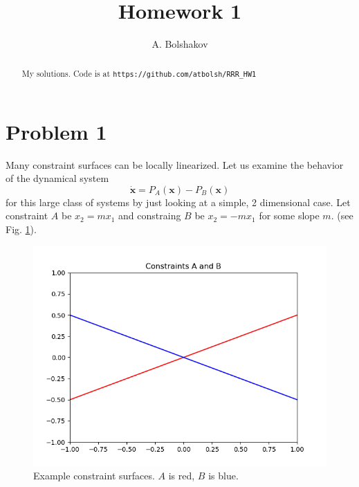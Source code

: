 \documentclass[psamsfonts]{amsart}
\title{Homework 1}
\author{A. Bolshakov}
\theoremstyle{definition}
\theoremstyle{remark}
\numberwithin{equation}{section}
\begin{document}
\maketitle


\begin{abstract}
My solutions. Code is at \texttt{https://github.com/atbolsh/RRR\_HW1}
\end{abstract}

\section{Problem 1}

Many constraint surfaces can be locally linearized. 
Let us examine the behavior of the dynamical system
\[
\dot{\mathbf{x}} = P_A(\mathbf{x}) - P_B(\mathbf{x})
\]
for this large class of systems by just looking at a simple, 2 dimensional case. 
Let constraint $A$ be
$x_2 = mx_1$
and constraing $B$ be 
$x_2 = -mx_1$
for some slope $m$.
(see Fig. \ref{fig1}).




\begin{figure}
\includegraphics[scale=0.5]{Figure_1.png}
\caption{Example constraint surfaces. $A$ is red, $B$ is blue.}
\label{fig1}
\end{figure}
\end{document}
